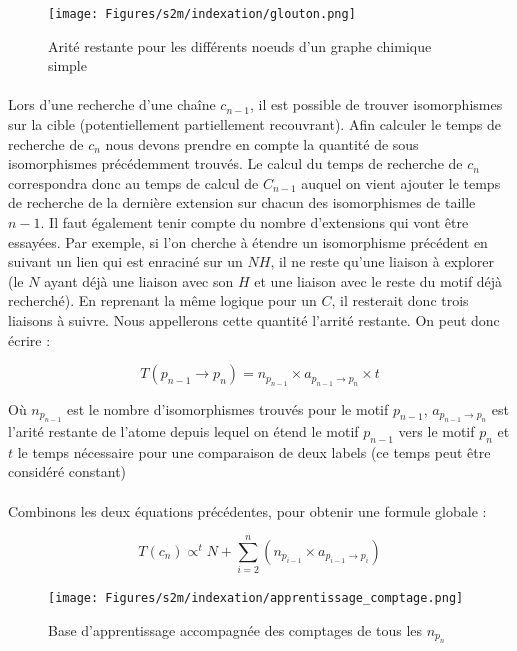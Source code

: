 \documentclass[12pt,french,twoside]{report}
\begin{document}
\begin{figure}
  \texttt{[image: Figures/s2m/indexation/glouton.png]}
  \caption{\label{arrite}Arité restante pour les différents noeuds d'un graphe chimique simple}
\end{figure}

\paragraph{}Lors d'une recherche d'une chaîne $c_{n-1}$, il est possible de trouver isomorphismes sur la cible
(potentiellement partiellement recouvrant). Afin calculer le temps de recherche de $c_n$ nous devons prendre en compte
la quantité de sous isomorphismes précédemment trouvés. Le calcul du temps de recherche de $c_n$ correspondra donc au temps de
calcul de $C_{n-1}$ auquel on vient ajouter le temps de recherche de la dernière extension sur chacun des isomorphismes de taille
$n-1$. Il faut également tenir compte du nombre d'extensions qui vont être essayées. Par exemple, si l'on cherche à étendre un
isomorphisme précédent en suivant un lien qui est enraciné sur un $NH$, il ne reste qu'une liaison à explorer (le $N$ ayant déjà
une liaison avec son $H$ et une liaison avec le reste du motif déjà recherché). En reprenant la même logique pour un $C$, il
resterait donc trois liaisons à suivre. Nous appellerons cette quantité l'arrité restante. On peut donc écrire :

\begin{equation}
 T(p_{n-1} \rightarrow p_n) = n_{p_{n-1}} \times a_{p_{n-1} \rightarrow p_n} \times t
\end{equation}

Où $n_{p_{n-1}}$ est le nombre d'isomorphismes trouvés pour le motif $p_{n-1}$, $a_{p_{n-1} \rightarrow p_n}$ est l'arité restante
de l'atome depuis lequel on étend le motif $p_{n-1}$ vers le motif $p_n$ et $t$ le temps nécessaire pour une comparaison de deux
labels (ce temps peut être considéré constant)

\paragraph{}Combinons les deux équations précédentes, pour obtenir une formule globale :

\begin{equation}
 T(c_n) \propto^t N + \sum_{i=2}^n (n_{p_{i-1}} \times a_{p_{i-1} \rightarrow p_i})
\end{equation}

\begin{figure}
  \texttt{[image: Figures/s2m/indexation/apprentissage\_comptage.png]}
  \caption{\label{app_compt}Base d'apprentissage accompagnée des comptages de tous les $n_{p_{n}}$}
\end{figure}
\end{document}
